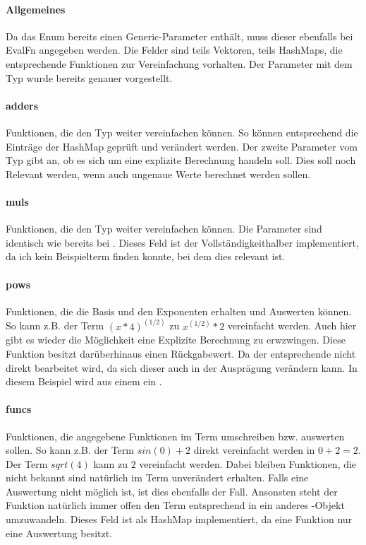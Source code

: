 \documentclass[11pt,a4paper, ngerman]{article}
\begin{document}
\paragraph{Allgemeines} Da das Enum  bereits einen Generic-Parameter enthält, muss dieser ebenfalls bei EvalFn angegeben werden. Die Felder sind teils Vektoren, teils HashMaps, die entsprechende Funktionen zur Vereinfachung vorhalten. Der Parameter mit dem Typ  wurde bereits genauer vorgestellt.

\paragraph{adders} Funktionen, die den Typ  weiter vereinfachen können. So können entsprechend die Einträge der HashMap geprüft und verändert werden. Der zweite Parameter vom Typ  gibt an, ob es sich um eine explizite Berechnung handeln soll. Dies soll noch Relevant werden, wenn auch ungenaue Werte berechnet werden sollen.

\paragraph{muls} Funktionen, die den Typ  weiter vereinfachen können. Die Parameter sind identisch wie bereits bei . Dieses Feld ist der Vollständigkeithalber implementiert, da ich kein Beispielterm finden konnte, bei dem dies relevant ist.

\paragraph{pows} Funktionen, die die Basis und den Exponenten erhalten und Auswerten können. So kann z.B. der Term $(x*4)^{(1/2)}$ zu $x^{(1/2)}*2$ vereinfacht werden. Auch hier gibt es wieder die Möglichkeit eine Explizite Berechnung zu erwzwingen. Diese Funktion besitzt darüberhinaus einen Rückgabewert. Da der entsprechende  nicht direkt bearbeitet wird, da sich dieser auch in der Ausprägung verändern kann. In diesem Beispiel wird aus einem  ein .

\paragraph{funcs} Funktionen, die angegebene Funktionen im Term umschreiben bzw. auswerten sollen. So kann z.B. der Term $sin(0) + 2$ direkt vereinfacht werden in $0 + 2 = 2$. Der Term $sqrt(4)$ kann zu $2$ vereinfacht werden. Dabei bleiben Funktionen, die  nicht bekannt sind natürlich im Term unverändert erhalten. Falls eine Auswertung nicht möglich ist, ist dies ebenfalls der Fall. Ansonsten steht der Funktion natürlich immer offen den Term entsprechend in ein anderes -Objekt umzuwandeln. Dieses Feld ist als HashMap implementiert, da eine Funktion nur eine Auswertung besitzt.
\end{document}
